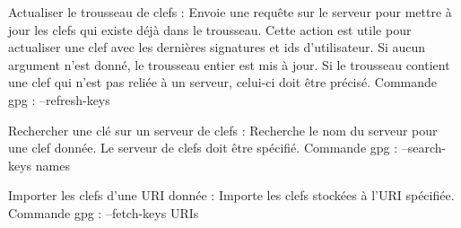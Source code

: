 Actualiser le trousseau de clefs : 
    Envoie une requête sur le serveur pour mettre à jour les clefs qui existe déjà dans le trousseau. Cette action est utile pour actualiser une clef
    avec les dernières signatures et ids d'utilisateur. Si aucun argument n'est donné, le trousseau entier est mis à jour. Si le trousseau contient une clef qui n'est pas reliée à un serveur, celui-ci doit être précisé.
    Commande gpg : --refresh-keys

Rechercher une clé sur un serveur de clefs : 
    Recherche le nom du serveur pour une clef donnée. Le serveur de clefs doit être spécifié. 
    Commande gpg : --search-keys names

Importer les clefs d'une URI donnée : 
    Importe les clefs stockées à l'URI spécifiée.
    Commande gpg : --fetch-keys URIs
